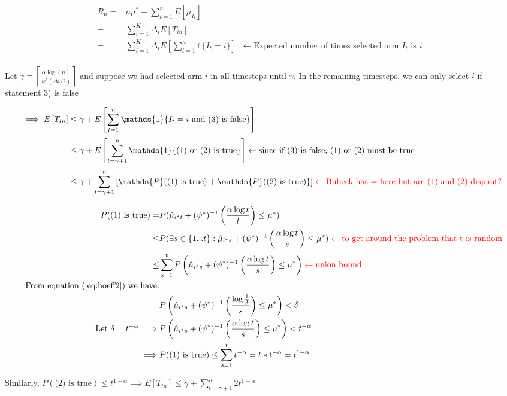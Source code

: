 \documentclass{article}
\newcommand{\ceil}[1]{\left \lceil {#1} \right\rceil}
\newcommand{\eq}[1]{\begin{align*}#1\end{align*}}
\theoremstyle{plain}
\theoremstyle{definition}
\begin{document}
\eq {
\bar{R}_n = & n\mu^* - \sum_{t=1}^{n}E[\mu_{I_t}] \\
= & \sum_{i=1}^{K}\Delta_i E[T_{in}]\\
= & \sum_{i=1}^{K}\Delta_i E\left[\sum_{t=1}^{n} \mathds{1} \{I_t = i\}\right] \;\; \leftarrow \text{Expected number of times selected arm $I_t$ is $i$ }\\
}


Let $\gamma = \ceil{\frac{\alpha \log(n)}{\psi^*(\Delta i/2)}}$ and suppose we had selected arm $i$ in all timesteps until $\gamma$. In the remaining timesteps, we can only select $i$ if statement 3) is false 

\eq{
\implies E\left[T_{in}\right] & \leq \gamma + E\left[\sum_{t=1}^{n} \mathds{1} \{I_t = i \text{ and (3) is false} \}\right] \\[3pt]
& \leq \gamma + E\left[\sum_{t=\gamma+1}^{n} \mathds{1} \{\text{(1) or (2) is true} \}\right] \leftarrow \text{since if (3) is false, (1) or (2) must be true}\\[3pt]
& \leq \gamma + \sum_{t=\gamma+1}^{n} \left[ \mathds{P}(\text{(1) is true}) + \mathds{P}(\text{(2) is true})  \}\right] \color{red} \leftarrow \text{Bubeck has $=$ here but are (1) and (2) disjoint?} 
}

\eq {
P(\text{(1) is true})  = & P(\hat{\mu}_{i^*t}+ (\psi^*)^{-1}\left( \frac{\alpha \log{t}}{t} \right) \leq \mu^*)\\
\leq & P(\exists s \in \{1...t\} : \hat{\mu}_{i^*s}+ (\psi^*)^{-1}\left( \frac{\alpha \log{t}}{s} \right) \leq \mu^*) \color{red} \leftarrow \text {to get around the problem that t is random}\\
\leq & \sum_{s=1}^t P\left( \hat{\mu}_{i^*s}+ (\psi^*)^{-1}\left( \frac{\alpha \log{t}}{s} \right) \leq \mu^* \right) \color{red} \leftarrow \text{union bound}\\
\text{ From equation (\ref{eq:hoeff2}) we have:}\\
& P\left( \hat{\mu}_{i^*s}+ (\psi^*)^{-1}\left( \frac{ \log{\frac{1}{\delta}}}{s} \right) \leq \mu^* \right) < \delta\\
\text{Let } \delta = t^{-\alpha} \implies & P\left( \hat{\mu}_{i^*s}+ (\psi^*)^{-1}\left( \frac{\alpha \log{t}}{s} \right)\leq \mu^* \right) < t^{-\alpha}\\
\implies & P(\text{(1) is true}) \leq \sum_{s=1}^t t^{-\alpha} = t*t^{-\alpha} =  t^{1-\alpha}
}

Similarly, $P(\text{(2) is true}) \leq t^{1-\alpha} \implies E[T_{in}] \leq \gamma + \sum_{t=\gamma+1}^n 2t^{1-\alpha}$
\end{document}
